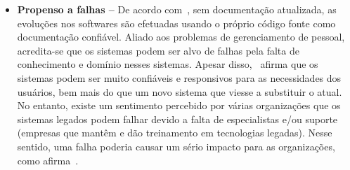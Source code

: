 \begin{itemize}
\item \textbf{Propenso a falhas --} De acordo com~\cite{S4_bennett1995legacy}, sem documentação atualizada, as evoluções nos softwares são efetuadas usando 
o próprio código fonte como documentação confiável. Aliado aos problemas de gerenciamento de pessoal, acredita-se que os sistemas podem ser alvo de 
falhas pela falta de conhecimento e domínio nesses sistemas. Apesar disso,~\cite{S4_bennett1995legacy} afirma que os sistemas podem ser muito confiáveis e 
responsivos para as necessidades dos usuários, bem mais do que um novo sistema que viesse a substituir o atual. No entanto, existe um sentimento percebido por várias organizações que os sistemas legados podem falhar devido a falta de especialistas e/ou suporte (empresas que mantêm e dão treinamento em tecnologias legadas). Nesse sentido, uma falha poderia causar um sério impacto para as organizações, como afirma~\cite{S3_Bisbal:1999}.

\end{itemize}
